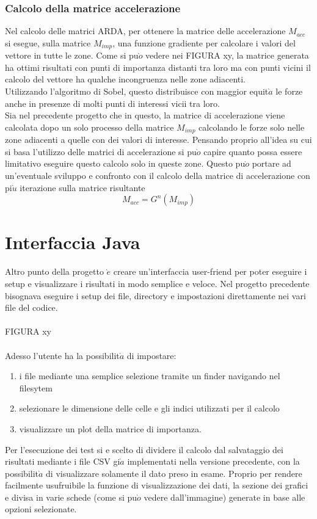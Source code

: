 \subsubsection{Calcolo della matrice accelerazione}
Nel calcolo delle matrici ARDA, per ottenere la matrice delle accelerazione $M_{acc}$ si esegue, sulla
matrice $M_{imp}$, una funzione gradiente per calcolare i valori del vettore in tutte le zone. Come si pu$\grave{o}$
vedere nei FIGURA xy, la matrice generata ha ottimi risultati con punti di importanza distanti tra loro
ma con punti vicini il calcolo del vettore ha qualche incongruenza nelle zone adiacenti.\\
Utilizzando l'algoritmo di Sobel, questo distribuisce con maggior equit$\grave{a}$ le forze anche in presenze di
molti punti di interessi vicii tra loro.\\
Sia nel precedente progetto che in questo, la matrice di accelerazione viene calcolata dopo un solo processo
della matrice $M_{imp}$ calcolando le forze solo nelle zone adiacenti a quelle con dei valori di interesse.
Pensando proprio all'idea su cui si basa l'utilizzo delle matrici di accelerazione si pu$\grave{o}$ capire quanto possa
essere limitativo eseguire questo calcolo solo in queste zone. Questo pu$\grave{o}$ portare ad un'eventuale sviluppo e
confronto con il calcolo della matrice di accelerazione con pi$\grave{u}$ iterazione sulla matrice risultante
\begin{equation}
M_{acc} = G^{n}(M_{imp})
\end{equation}

\section{Interfaccia Java}
Altro punto della progetto $\grave{e}$ creare un'interfaccia user-friend per poter eseguire i setup e visualizzare
i risultati in modo semplice e veloce. Nel progetto precedente bisognava eseguire i setup dei file,
directory e impostazioni direttamente nei vari file del codice.\\
\\
FIGURA xy\\
\\
Adesso l'utente ha la possibilit$\grave{a}$ di impostare:
\begin{enumerate}
    \item i file mediante una semplice selezione tramite un finder navigando nel filesytem
    \item selezionare le dimensione delle celle e gli indici utilizzati per il calcolo
    \item visualizzare un plot della matrice di importanza.
\end{enumerate}
Per l'esecuzione dei test si e scelto di dividere il calcolo dal salvataggio dei risultati mediante i file CSV
gi$\grave{a}$ implementati nella versione precedente, con la possibilit$\grave{a}$ di visualizzare solamente il dato preso in esame.
Proprio per rendere facilmente usufruibile la funzione di visualizzazione dei dati, la sezione dei grafici e
divisa in varie schede (come si pu$\grave{o}$ vedere dall'immagine) generate in base alle opzioni selezionate.

